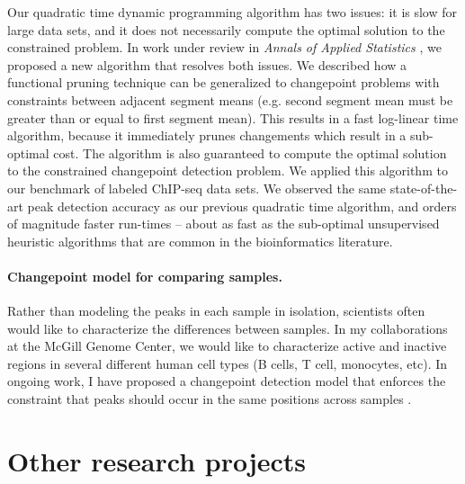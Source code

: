 \documentclass{article}
\begin{document}
Our quadratic time dynamic programming algorithm has two issues: it is
slow for large data sets, and it does not necessarily compute the
optimal solution to the constrained problem. In work under review in
\emph{Annals of Applied Statistics}
\citep{Hocking-constrained-changepoint-detection}, we proposed a new
algorithm that resolves both issues. We described how a functional
pruning technique can be generalized to changepoint problems with
constraints between adjacent segment means (e.g. second segment mean
must be greater than or equal to first segment mean). This results in a fast
log-linear time algorithm, because it immediately prunes changements
which result in a sub-optimal cost. The algorithm is also guaranteed
to compute the optimal solution to the constrained changepoint detection
problem. We applied this algorithm to our benchmark of labeled
ChIP-seq data sets. We observed the same state-of-the-art peak
detection accuracy as our previous quadratic time algorithm, and
orders of magnitude faster run-times -- about as fast as the
sub-optimal unsupervised heuristic algorithms that are common 
in the bioinformatics literature.

\paragraph{Changepoint model for comparing samples.}
Rather than modeling the peaks in each sample in isolation, scientists
often would like to characterize the differences between samples. In
my collaborations at the McGill Genome Center, we would like to
characterize active and inactive regions in several different human
cell types (B cells, T cell, monocytes, etc). In ongoing work, I have
proposed a changepoint detection model that enforces the constraint that peaks
should occur in the same positions across samples
\citep{HOCKING-PeakSegJoint}.

\section{Other research projects}

\end{document}
